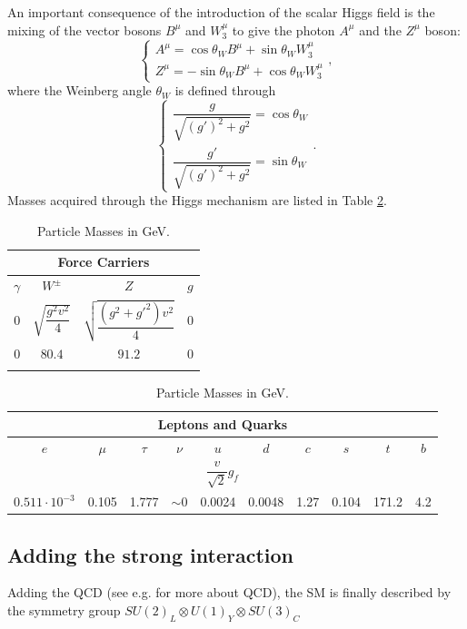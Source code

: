 An important consequence of the introduction of the scalar Higgs field is the mixing of the vector bosons $B^{\mu}$ and $W_{3}^{\mu}$ to give the photon $A^{\mu}$ and the $Z^{\mu}$ boson:\begin{equation}\label{eq:AZ}
\left \{ \begin{array}{ll}
A^{\mu} = \cos\theta_{W}B^{\mu} + \sin\theta_{W}W_{3}^{\mu}\\
Z^{\mu} = -\sin\theta_{W}B^{\mu} + \cos\theta_{W}W_{3}^{\mu}\end{array}\right. ,
\end{equation}where the Weinberg angle $\theta_{W}$ is defined through\begin{equation}\label{eq:weinb}
\left \{ \begin{array}{ll}
\dfrac{g}{\sqrt{(g')^{2}+g^{2}}} = \cos\theta_{W} \\
\dfrac{g'}{\sqrt{(g')^{2}+g^{2}}} = \sin\theta_{W} \end{array}\right. .
\end{equation} Masses acquired through the Higgs mechanism are listed in Table \ref{tab:mass}.
\begin{table}[htb]\centering\begin{tabular}{cccc}
\multicolumn{4}{c}{Force Carriers} \\ \midrule
$\gamma $ &$W^{\pm}$ &$Z$ &$g$ \\
$0$ & $\sqrt{\dfrac{g^{2}v^{2}}{4}} $& $\sqrt{\dfrac{(g^{2}+g'^{2})v^{2}}{4}} $&  $0$ \\
$0$ & $80.4$ & $91.2$ & $0$ \\\hline \hline\\
\end{tabular}

\begin{tabular}{cccccccccc}
\multicolumn{10}{c}{Leptons and Quarks} \\ \midrule
$e$ & $\mu$ &$\tau$ &$\nu$ & $u$ & $d$ & $c$ & $s$ &$ t$ & $b$ \\
\multicolumn{10}{c}{$\dfrac{v}{\sqrt{2}}g_{f}$} \\
$0.511\cdot10^{-3} $ & 0.105 & 1.777 & $\sim0$ & 0.0024 & 0.0048 & 1.27 & 0.104 & 171.2 & 4.2 \\\hline \hline
\end{tabular}\caption{Particle Masses in GeV.}\label{tab:mass} \end{table}


\subsection{Adding the strong interaction}\label{sec:qcdlagr}

Adding the QCD (see e.g. \cite{Ecker} for more about QCD), the SM is finally described by the symmetry group $SU(2)_{L}\otimes U(1)_{Y}\otimes SU(3)_{C}$ 



